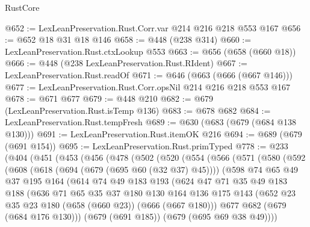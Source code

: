 \begin{lexlean}{RustCore}
\begin{coremodule}
{\begin{coremodule}
{{{{{@652 := LexLeanPreservation.Rust.Corr.var @214 @216 @218 @553 @167
@656 := @652 @18 @31 @18 @146
@658 := @448 (@238 @314)
@660 := LexLeanPreservation.Rust.ctxLookup @553
@663 := @656 (@658 (@660 @18))
@666 := @448 (@238 LexLeanPreservation.Rust.RIdent)
@667 := LexLeanPreservation.Rust.readOf
@671 := @646 (@663 (@666 (@667 @146)))
@677 := LexLeanPreservation.Rust.Corr.opsNil @214 @216 @218 @553 @167
@678 := @671 @677
@679 := @448 @210
@682 := @679 (LexLeanPreservation.Rust.isTemp @136)
@683 := @678 @682
@684 := LexLeanPreservation.Rust.tempFresh
@689 := @630 (@683 (@679 (@684 @138 @130)))
@691 := LexLeanPreservation.Rust.itemOK @216
@694 := @689 (@679 (@691 @154))
@695 := LexLeanPreservation.Rust.primTyped
@778 := @233
    (@404
      (@451
        (@453
          (@456
            (@478
              (@502
                (@520
                  (@554
                    (@566
                      (@571
                        (@580
                          (@592
                            (@608
                              (@618 (@694 (@679 (@695 @60 (@32 @37) @45))))
                              (@598
                                @74
                                @65
                                @49
                                @37
                                @195
                                @164
                                (@614
                                  @74
                                  @49
                                  @183
                                  @193
                                  (@624
                                    @47
                                    @71
                                    @35
                                    @49
                                    @183
                                    @188
                                    (@636
                                      @71
                                      @65
                                      @35
                                      @37
                                      @180
                                      @130
                                      @164
                                      @136
                                      @175
                                      @143
                                      (@652 @23 @35 @23 @180 (@658 (@660 @23)) (@666 (@667 @180)))
                                      @677
                                      @682
                                      (@679 (@684 @176 @130)))
                                    (@679 (@691 @185))
                                    (@679 (@695 @69 @38 @49))))
}}}}}
\end{coremodule}}
\end{coremodule}
\end{lexlean}
